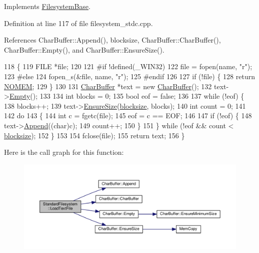 Implements \hyperlink{classFilesystemBase_adc4a9e1dc189bcd221e3b994bc854d46}{Filesystem\+Base}.



Definition at line 117 of file filesystem\+\_\+stdc.\+cpp.



References Char\+Buffer\+::\+Append(), blocksize, Char\+Buffer\+::\+Char\+Buffer(), Char\+Buffer\+::\+Empty(), and Char\+Buffer\+::\+Ensure\+Size().


\begin{DoxyCode}
118 \{
119     FILE *file;
120 
121 \textcolor{preprocessor}{#if !defined(\_WIN32)}
122     file = fopen(name, \textcolor{stringliteral}{"r"});
123 \textcolor{preprocessor}{#else}
124     fopen\_s(&file, name, \textcolor{stringliteral}{"r"});
125 \textcolor{preprocessor}{#endif}
126 
127     \textcolor{keywordflow}{if} (!file) \{
128         \textcolor{keywordflow}{return} \hyperlink{platform_8h_a46ff2bfbf0d44b8466a2251d5bd5e6f8}{NOMEM};
129     \}
130 
131     \hyperlink{classCharBuffer}{CharBuffer} *text = \textcolor{keyword}{new} \hyperlink{classCharBuffer}{CharBuffer}();
132     text->\hyperlink{classCharBuffer_abe39d3fd7d8b9c8ec343af2cae7adc96}{Empty}();
133 
134     \textcolor{keywordtype}{int} blocks = 0;
135     \textcolor{keywordtype}{bool} eof = \textcolor{keyword}{false};
136 
137     \textcolor{keywordflow}{while} (!eof) \{
138         blocks++;
139         text->\hyperlink{classCharBuffer_ad1907009b5ad136692b989fa96bf2f7e}{EnsureSize}(\hyperlink{classStandardFilesystem_aa04dcecabc636b2154a0e55847f689f4}{blocksize}, blocks);
140         \textcolor{keywordtype}{int} count = 0;
141 
142         \textcolor{keywordflow}{do}
143         \{
144             \textcolor{keywordtype}{int} c = fgetc(file);
145             eof = c == EOF;
146 
147             \textcolor{keywordflow}{if} (!eof) \{
148                 text->\hyperlink{classCharBuffer_a045b38735f7b3007c1b98d3d7b7feafe}{Append}((\textcolor{keywordtype}{char})c);
149                 count++;
150             \}
151         \}  \textcolor{keywordflow}{while} (!eof && count < \hyperlink{classStandardFilesystem_aa04dcecabc636b2154a0e55847f689f4}{blocksize});
152     \}
153 
154     fclose(file);
155     \textcolor{keywordflow}{return} text;
156 \}
\end{DoxyCode}


Here is the call graph for this function\+:
\nopagebreak
\begin{figure}[H]
\begin{center}
\leavevmode
\includegraphics[width=350pt]{d6/d31/classStandardFilesystem_aa01514561ced127f2453b3a913e077ef_cgraph}
\end{center}
\end{figure}


